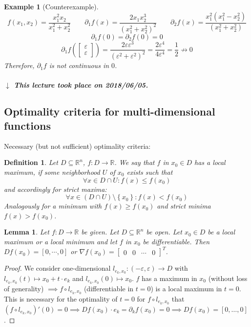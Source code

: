 \documentclass{article}
\newtheorem{example}{Example}  \numberwithin{example}{section}
\newtheorem{definition}{Definition}  \numberwithin{definition}{section}
\newtheorem{lemma}{Lemma}  \numberwithin{lemma}{section}
\newcommand{\set}[1]{\left\{#1\right\}}
\newcommand{\dateref}[1]{%
  \begin{mdframed}[backgroundcolor=gray!10,innerbottommargin=0pt,innertopmargin=0pt]
    \paragraph{\textit{$\downarrow$ This lecture took place on #1.}}%
  \end{mdframed}%
}
\begin{document}
\begin{example}[Counterexample]
  \[
    f(x_1, x_2) = \frac{x_1^2 x_2}{x_1^2 + x_2^2}
    \qquad \partial_1 f(x) = \frac{2x_1 x_2^3}{(x_1^2 + x_2^2)^2}
    \qquad \partial_2 f(x) = \frac{x_1^2 (x_1^2 - x_2^2)}{(x_1^2 + x_2^2)}
  \] \[
    \partial_1 f(0) = \partial_2 f(0) = 0
  \] \[
    \partial_1f(\begin{bmatrix} \varepsilon \\ \varepsilon \end{bmatrix}) = \frac{2 \varepsilon \varepsilon^3}{(\varepsilon^2 + \varepsilon^2)^2} = \frac{2\varepsilon^4}{4 \varepsilon^4} = \frac12 \not\to 0
  \]
  Therefore, $\partial_1 f$ is not continuous in $0$.
\end{example}

\dateref{2018/06/05}

\subsection{Optimality criteria for multi-dimensional functions}

Necessary (but not sufficient) optimality criteria:
\begin{definition} %
  Let $D \subseteq \mathbb R^n$, $f: D \to \mathbb R$.
  We say that $f$ in $x_0 \in D$ has a local maximum, if some neighborhood $U$ of $x_0$ exists such that
  \[ \forall x \in D \cap U: f(x) \leq f(x_0) \]
  and accordingly for strict maxima:
  \[ \forall x \in (D \cap U) \setminus \set{x_0}: f(x) < f(x_0) \]
  Analogously for a minimum with $f(x) \geq f(x_0)$ and strict minima $f(x) > f(x_0)$.
\end{definition}

\begin{lemma} %
  \label{l8}
  Let $f: D \to \mathbb R$ be given. Let $D \subseteq \mathbb R^n$ be open.
  Let $x_0 \in D$ be a local maximum or a local minimum and let $f$ in $x_0$ be differentiable.
  Then $Df(x_0) = [0, \cdots, 0]$ or $\nabla f(x_0) = \begin{bmatrix} 0 & 0 & \cdots & 0 \end{bmatrix}^T$.
\end{lemma}

\begin{proof}
  We consider one-dimensional $l_{e_k,x_0}: (-\varepsilon, \varepsilon) \to D$ with $l_{e_k, x_0}(t) \mapsto x_0 + t \cdot e_k$
  and $l_{e_k, x_0}(0) \mapsto x_0$. $f$ has a maximum in $x_0$ (without loss of generality) $\implies f \circ l_{e_k,x_0}$ (differentiable in $t = 0$) is a local maximum in $t = 0$. This is necessary for the optimality of $t = 0$ for $f \circ l_{e_k,x_0}$ that $(f \circ l_{e_k,x_0})'(0) = 0 \implies Df(x_0) \cdot e_k = \partial_k f(x_0) = 0 \implies Df(x_0) = [0, \dots, 0]$.
\end{proof}
\end{document}
